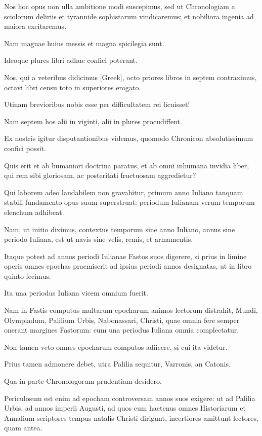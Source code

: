 \begin{parnumbers}
Nos hoc opus non ulla ambitione
modi suscepimus, sed ut Chronologiam a sciolorum deliriis et tyrannide
sophistarum vindicaremus; et nobiliora ingenia ad maiora excitaremus.

Nam magnae huius messis et magna spicilegia sunt.

Ideoque
plures libri adhuc confici poterant.

Nos, qui a veteribus didicimus
\textgreek{[Greek]}, octo priores libros in septem contraximus,
octavi libri censu toto in superiores erogato.

Utinam brevioribus nobis esse per difficultatem rei licuisset!

Nam septem hos alii
in viginti, alii in plures procudiffent.

Ex nostris igitur disputantionibus
videmus, quomodo Chronicon absolutissimum confici possit.

Quis
erit et ab humaniori doctrina paratus, et ab omni inhumana invidia
liber, qui rem sibi gloriosam, ac posteritati fructuosam aggredietur?

Qui laborem adeo laudabilem non gravabitur, primum anno Iuliano
tanquam stabili fundamento opus suum superstruat: periodum Iulianam
verum temporum elenchum adhibeat.

Nam, ut initio diximus,
contextus temporum sine anno Iuliano, annus sine periodo Iuliana,
est ut navis sine velis, remis, et armamentis.

Itaque potest ad
annos periodi Iulianae Fastos suos digerere, si prius in limine operis
omnes epochas praemiserit ad ipsius periodi annos designatas, ut in
libro quinto fecimus.

Ita una periodus Iuliana vicem omnium fuerit.

Nam in Fastis computus multarum epocharum animos lectorum distrahit,
Mundi, Olympiadum, Palilium Urbis, Nabonassari, Christi,
quae omnia fere semper onerant margines Fastorum: cum una periodus
Iuliana omnia complectatur.

Non tamen veto omnes epocharum
computos adiicere, si cui ita videtur.

Prius tamen admonere debet,
utra Palilia sequitur, Varronis, an Catonis.

Qua in parte Chronologorum
prudentiam desidero.

Periculosum est enim ad epocham
controversam annos suos exigere: ut ad Palilia Urbis, ad annos imperii
Augusti, ad quos cum hactenus omnes Historiarum et Annalium
scriptores tempus natalis Christi dirigunt, incertiores amittunt
lectores, quam antea.


\end{parnumbers}
